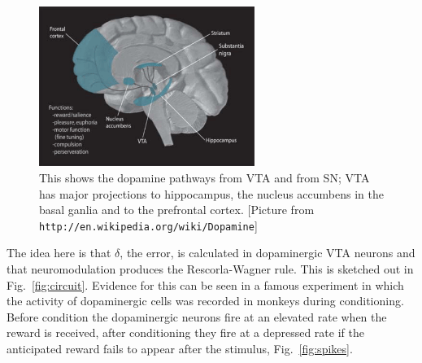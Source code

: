 \documentclass[11pt,a4paper]{scrartcl}
\begin{document}
\begin{figure}
\begin{center}
\includegraphics[width=7cm]{Dopamine_Pathways.png}
\end{center}
\caption{This shows the dopamine pathways from VTA and from SN; VTA has major projections to hippocampus, the nucleus accumbens in the basal ganlia and to the prefrontal cortex. [Picture from \texttt{http://en.wikipedia.org/wiki/Dopamine}]\label{fig:VTA}}
\end{figure}

The idea here is that $\delta$, the error, is calculated in
dopaminergic VTA neurons and that neuromodulation produces the
Rescorla-Wagner rule. This is sketched out in
Fig.~\ref{fig:circuit}. Evidence for this can be seen in a famous
experiment \cite{SchultzDayanMontague1997a} in which the activity of
dopaminergic cells was recorded in monkeys during conditioning. Before
condition the dopaminergic neurons fire at an elevated rate when the
reward is received, after conditioning they fire at a depressed rate
if the anticipated reward fails to appear after the stimulus, Fig.~\ref{fig:spikes}.
\end{document}
